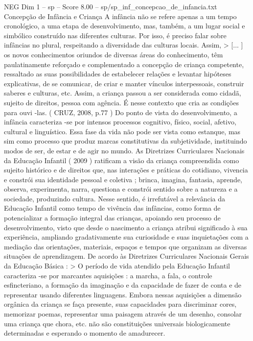 \begin{textsample}{NEG Dim 1 – sp – Score 8.00 – sp/sp\_inf\_concepcao\_de\_infancia.txt}  \label{ex:f1_neg_178}
Concepção de Infância e Criança A infância não se refere apenas a um tempo cronológico, a uma etapa de desenvolvimento, mas, também, a um lugar social e simbólico construído nas diferentes culturas.
Por isso, é preciso falar sobre infâncias no plural, respeitando a diversidade das culturas locais.
Assim, > [... ] os novos conhecimentos oriundos de diversas áreas do conhecimento, têm paulatinamente reforçado e complementado a concepção de criança competente, ressaltado as suas possibilidades de estabelecer relações e levantar hipóteses explicativas, de se comunicar, de criar e manter vínculos interpessoais, construir saberes e culturas, etc.
Assim, a criança passou a ser considerada como cidadã, sujeito de direitos, pessoa com agência.
É nesse contexto que cria as condições para ouvi -las. ( CRUZ, 2008, p.77 ) Do ponto de vista do desenvolvimento, a infância caracteriza -se por intensos processos cognitivo, físico, social, afetivo, cultural e linguístico.
Essa fase da vida não pode ser vista como estanque, mas sim como processo que produz marcas constitutivas da subjetividade, instituindo modos de ser, de estar e de agir no mundo.
As Diretrizes Curriculares Nacionais da Educação Infantil ( 2009 ) ratificam a visão da criança compreendida como sujeito histórico e de direitos que, nas interações e práticas do cotidiano, vivencia e constrói sua identidade pessoal e coletiva ; brinca, imagina, fantasia, aprende, observa, experimenta, narra, questiona e constrói sentido sobre a natureza e a sociedade, produzindo cultura.
Nesse sentido, é irrefutável a relevância da Educação Infantil como tempo de vivência das infâncias, como forma de potencializar a formação integral das crianças, apoiando seu processo de desenvolvimento, visto que desde o nascimento a criança atribui significado à sua experiência, ampliando gradativamente sua curiosidade e suas inquietações com a mediação das orientações, materiais, espaços e tempos que organizam as diversas situações de aprendizagem.
De acordo às Diretrizes Curriculares Nacionais Gerais da Educação Básica : > O período de vida atendido pela Educação Infantil caracteriza -se por marcantes aquisições : a marcha, a fala, o controle esfincteriano, a formação da imaginação e da capacidade de fazer de conta e de representar usando diferentes linguagens.
Embora nessas aquisições a dimensão orgânica da criança se faça presente, suas capacidades para discriminar cores, memorizar poemas, representar uma paisagem através de um desenho, consolar uma criança que chora, etc. não são constituições universais biologicamente determinadas e esperando o momento de amadurecer.

\end{textsample}

